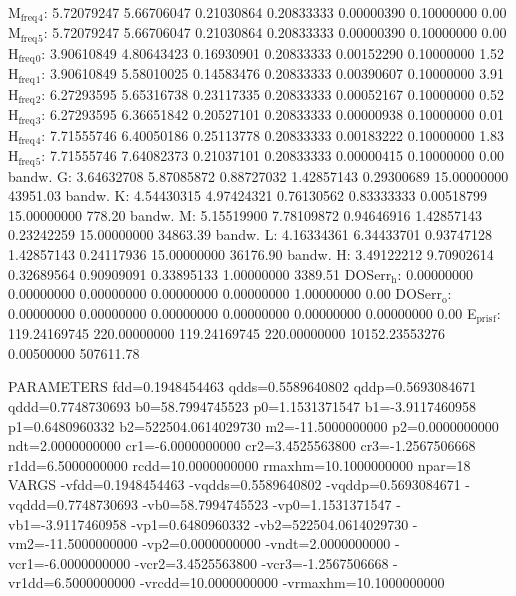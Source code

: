 \documentclass[11pt]{article}
\begin{document}
M\(_{\text{freq}}\)\(_{\text{4}}\):   5.72079247   5.66706047   0.21030864   0.20833333   0.00000390   0.10000000         0.00
M\(_{\text{freq}}\)\(_{\text{5}}\):   5.72079247   5.66706047   0.21030864   0.20833333   0.00000390   0.10000000         0.00
H\(_{\text{freq}}\)\(_{\text{0}}\):   3.90610849   4.80643423   0.16930901   0.20833333   0.00152290   0.10000000         1.52
H\(_{\text{freq}}\)\(_{\text{1}}\):   3.90610849   5.58010025   0.14583476   0.20833333   0.00390607   0.10000000         3.91
H\(_{\text{freq}}\)\(_{\text{2}}\):   6.27293595   5.65316738   0.23117335   0.20833333   0.00052167   0.10000000         0.52
H\(_{\text{freq}}\)\(_{\text{3}}\):   6.27293595   6.36651842   0.20527101   0.20833333   0.00000938   0.10000000         0.01
H\(_{\text{freq}}\)\(_{\text{4}}\):   7.71555746   6.40050186   0.25113778   0.20833333   0.00183222   0.10000000         1.83
H\(_{\text{freq}}\)\(_{\text{5}}\):   7.71555746   7.64082373   0.21037101   0.20833333   0.00000415   0.10000000         0.00
bandw. G:   3.64632708   5.87085872   0.88727032   1.42857143   0.29300689  15.00000000     43951.03
bandw. K:   4.54430315   4.97424321   0.76130562   0.83333333   0.00518799  15.00000000       778.20
bandw. M:   5.15519900   7.78109872   0.94646916   1.42857143   0.23242259  15.00000000     34863.39
bandw. L:   4.16334361   6.34433701   0.93747128   1.42857143   0.24117936  15.00000000     36176.90
bandw. H:   3.49122212   9.70902614   0.32689564   0.90909091   0.33895133   1.00000000      3389.51
DOSerr\(_{\text{h}}\):   0.00000000   0.00000000   0.00000000   0.00000000   0.00000000   1.00000000         0.00
DOSerr\(_{\text{o}}\):   0.00000000   0.00000000   0.00000000   0.00000000   0.00000000   0.00000000         0.00
E\(_{\text{pris}}\)\(_{\text{f}}\): 119.24169745 220.00000000 119.24169745 220.00000000 10152.23553276   0.00500000    507611.78



PARAMETERS
  fdd=0.1948454463 qdds=0.5589640802 qddp=0.5693084671 qddd=0.7748730693 b0=58.7994745523 p0=1.1531371547 b1=-3.9117460958 p1=0.6480960332 b2=522504.0614029730 m2=-11.5000000000 p2=0.0000000000 ndt=2.0000000000 cr1=-6.0000000000 cr2=3.4525563800 cr3=-1.2567506668 r1dd=6.5000000000 rcdd=10.0000000000 rmaxhm=10.1000000000 npar=18 
VARGS
    -vfdd=0.1948454463 -vqdds=0.5589640802 -vqddp=0.5693084671 -vqddd=0.7748730693 -vb0=58.7994745523 -vp0=1.1531371547 -vb1=-3.9117460958 -vp1=0.6480960332 -vb2=522504.0614029730 -vm2=-11.5000000000 -vp2=0.0000000000 -vndt=2.0000000000 -vcr1=-6.0000000000 -vcr2=3.4525563800 -vcr3=-1.2567506668 -vr1dd=6.5000000000 -vrcdd=10.0000000000 -vrmaxhm=10.1000000000 
\end{document}
